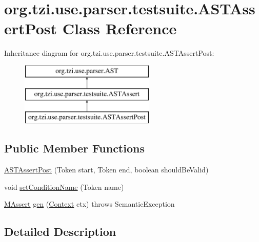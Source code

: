 \hypertarget{classorg_1_1tzi_1_1use_1_1parser_1_1testsuite_1_1_a_s_t_assert_post}{\section{org.\-tzi.\-use.\-parser.\-testsuite.\-A\-S\-T\-Assert\-Post Class Reference}
\label{classorg_1_1tzi_1_1use_1_1parser_1_1testsuite_1_1_a_s_t_assert_post}
}
Inheritance diagram for org.\-tzi.\-use.\-parser.\-testsuite.\-A\-S\-T\-Assert\-Post\-:\begin{figure}[H]
\begin{center}
\leavevmode
\includegraphics[height=3.000000cm]{classorg_1_1tzi_1_1use_1_1parser_1_1testsuite_1_1_a_s_t_assert_post}
\end{center}
\end{figure}
\subsection*{Public Member Functions}
\begin{DoxyCompactItemize}
\item 
\hyperlink{classorg_1_1tzi_1_1use_1_1parser_1_1testsuite_1_1_a_s_t_assert_post_aaf4f1385d1433e8bee59fcf24cc84da4}{A\-S\-T\-Assert\-Post} (Token start, Token end, boolean should\-Be\-Valid)
\item 
void \hyperlink{classorg_1_1tzi_1_1use_1_1parser_1_1testsuite_1_1_a_s_t_assert_post_a35ca5c00041488d15c2ae5db51553ca5}{set\-Condition\-Name} (Token name)
\item 
\hyperlink{classorg_1_1tzi_1_1use_1_1uml_1_1sys_1_1testsuite_1_1_m_assert}{M\-Assert} \hyperlink{classorg_1_1tzi_1_1use_1_1parser_1_1testsuite_1_1_a_s_t_assert_post_aae33e15344cc8ff619170ff67ce7d328}{gen} (\hyperlink{classorg_1_1tzi_1_1use_1_1parser_1_1_context}{Context} ctx)  throws Semantic\-Exception 
\end{DoxyCompactItemize}


\subsection{Detailed Description}


